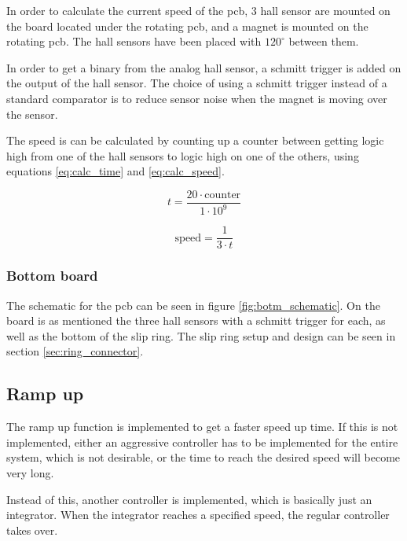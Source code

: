 In order to calculate the current speed of the pcb, 3 hall sensor are mounted on the board located under the rotating pcb, and a magnet is mounted on the rotating pcb.
The hall sensors have been placed with $120^{\circ}$ between them.

In order to get a binary from the analog hall sensor, a schmitt trigger is added on the output of the hall sensor.
The choice of using a schmitt trigger instead of a standard comparator is to reduce sensor noise when the magnet is moving over the sensor.

The speed is can be calculated by counting up a counter between getting logic high from one of the hall sensors to  logic high on one of the others, using equations  \ref{eq:calc_time} and \ref{eq:calc_speed}.

\begin{equation} \label{eq:calc_time}
 t = \frac{20\cdot \text{counter}}{1\cdot 10^9}
\end{equation}

\begin{equation} \label{eq:calc_speed}
 \text{speed} = \frac{1}{3\cdot t}
\end{equation}

\subsubsection{Bottom board}
The schematic for the pcb can be seen in figure \ref{fig:botm_schematic}.
On the board is as mentioned the three hall sensors with a schmitt trigger for each, as well as the bottom of the slip ring. The slip ring setup and design can be seen in section \ref{sec:ring_connector}. 


\subsection{Ramp up}

The ramp up function is implemented to get a faster speed up time.
If this is not implemented, either an aggressive controller has to be implemented for the entire system, which is not desirable, or the time to reach the desired speed will become very long.

Instead of this, another controller is implemented, which is basically just an integrator.
When the integrator reaches a specified speed, the regular controller takes over. 